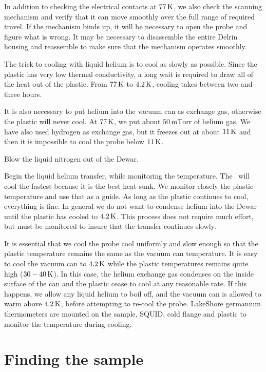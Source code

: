 In addition to checking the electrical contacts at $77\,\kelvin$, 
we also check the
scanning mechanism and verify that it can move smoothly over
the full range of required travel. If the mechanism binds up, it will
be necessary to open the probe and figure what is wrong. It may be
necessary to disassemble the entire Delrin housing and reassemble to
make sure that the mechanism operates smoothly. 

The trick to cooling with liquid helium 
is to cool as slowly as possible. Since the plastic has
very low thermal conductivity, a long wait is required to draw all of the
heat out of the plastic. From $77\,\kelvin$ to $4.2\,\kelvin$, 
cooling takes between
two and three hours. 

It is also necessary to put helium into the vacuum can as exchange gas, 
otherwise the plastic will never cool. At $77\,\kelvin$, we put about 
$50\,\mathrm{mTorr}$ 
of helium gas. We have also used hydrogen as exchange gas, but it freezes
out at about $11\,\kelvin$ and then it is impossible to cool the probe below
$11\,\kelvin$. 

Blow the liquid nitrogen out of the Dewar.

Begin the liquid helium transfer, while monitoring the temperature.
The \squid\ will cool the fastest because it is the best heat sunk. 
We monitor closely the plastic temperature and use that as a guide. 
As long as the plastic continues to cool, everything is fine. In
general we do not want to condense helium into the Dewar until
the plastic has cooled to $4.2\,\kelvin$. This process does not require much
effort, but must be monitored to insure that the transfer continues
slowly. 

It is essential that we cool the probe cool uniformly and slow enough so
that the plastic temperature remains the same as the vacuum can 
temperature. It is easy to cool the vacuum can to $4.2\,\kelvin$ while the 
plastic temperatures remains quite high ($30-40\,\kelvin$). In this case, 
the helium exchange gas condenses on the inside surface of the can
and the plastic cease to cool at any reasonable rate. If this happens, we
allow
any liquid helium to boil off, and the vacuum can is allowed to
warm above $4.2\,\kelvin$, before attempting to re-cool the probe. LakeShore 
germanium thermometers are mounted on the sample, SQUID, cold flange and 
plastic to monitor the temperature during cooling. 

\section{Finding the sample}

